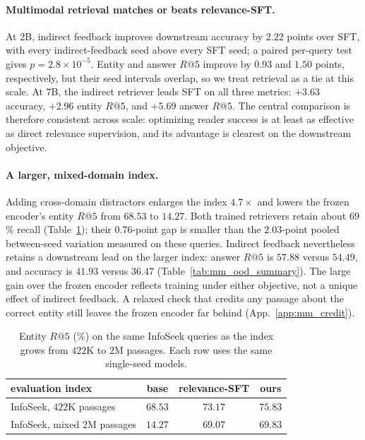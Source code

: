 \paragraph{Multimodal retrieval matches or beats relevance-SFT.}
At 2B, indirect feedback improves downstream accuracy by $2.22$ points over SFT, with every
indirect-feedback seed above every SFT seed; a paired per-query test gives
$p=2.8\times10^{-5}$. Entity and answer $R@5$ improve by $0.93$ and $1.50$ points, respectively,
but their seed intervals overlap, so we treat retrieval as a tie at this scale. At 7B, the indirect
retriever leads SFT on all three metrics: $+3.63$ accuracy, $+2.96$ entity $R@5$, and $+5.69$
answer $R@5$. The central comparison is therefore consistent across scale: optimizing reader
success is at least as effective as direct relevance supervision, and its advantage is clearest on
the downstream objective.

\paragraph{A larger, mixed-domain index.}
Adding cross-domain distractors enlarges the index $4.7\times$ and lowers the frozen encoder's
entity $R@5$ from $68.53$ to $14.27$. Both trained retrievers retain about $69$\% recall
(Table~\ref{tab:rag_mixed_domain}); their $0.76$-point gap is smaller than the $2.03$-point pooled
between-seed variation measured on these queries. Indirect feedback nevertheless retains a
downstream lead on the larger index:
answer $R@5$ is $57.88$ versus $54.49$, and accuracy is $41.93$ versus $36.47$
(Table~\ref{tab:mm_ood_summary}). The large gain over the frozen encoder reflects training under
either objective, not a unique effect of indirect feedback. A relaxed check that credits any passage
about the correct entity still leaves the frozen encoder far behind
(App.~\ref{app:mm_credit}).

\begin{table}[H]
\centering\small
\caption{Entity $R@5$ (\%) on the same InfoSeek queries as the index grows from $422$K to $2$M
passages. Each row uses the same single-seed models.}
\label{tab:rag_mixed_domain}
\begin{tabular}{lccc}
\toprule
evaluation index & base & relevance-SFT & ours \\
\midrule
InfoSeek, $422$K passages      & $68.53$ & $73.17$ & $\mathbf{75.83}$ \\
InfoSeek, mixed $2$M passages  & $14.27$ & $69.07$ & $\mathbf{69.83}$ \\
\bottomrule
\end{tabular}
\end{table}

